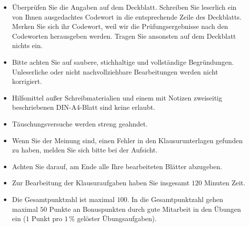 \documentclass{uebblatt}
\begin{document}
{  \begin{itemize}
  \item Überprüfen Sie die Angaben auf dem Deckblatt. Schreiben Sie leserlich ein
  von Ihnen ausgedachtes Codewort in die entsprechende Zeile des Deckblatts.
  Merken Sie sich ihr Codewort, weil wir die Prüfungsergebnisse nach den
  Codeworten herausgeben werden. Tragen Sie ansonsten auf dem Deckblatt nichts
  ein.
  \item Bitte achten Sie auf saubere, stichhaltige und vollständige Begründungen.
  Unleserliche oder nicht nachvollziehbare Bearbeitungen werden nicht korrigiert.
  \item Hilfsmittel außer Schreibmaterialien und einem mit Notizen zweiseitig
  beschriebenen DIN-A4-Blatt sind keine erlaubt.
  \item Täuschungsversuche werden streng geahndet.
  \item Wenn Sie der Meinung sind, einen Fehler in den Klausurunterlagen gefunden
  zu haben, melden Sie sich bitte bei der Aufsicht.
  \item Achten Sie darauf, am Ende alle Ihre bearbeiteten Blätter abzugeben.
  \item Zur Bearbeitung der Klausuraufgaben haben Sie insgesamt $120$ Minuten Zeit.
  \item Die Gesamtpunktzahl ist maximal $100$. In die Gesamtpunktzahl gehen maximal
  $50$ Punkte an Bonuspunkten durch gute Mitarbeit in den Übungen ein
  ($1$ Punkt pro $1\,\%$ gelöster Übungsaufgaben).
  \end{itemize}
}
\end{document}
